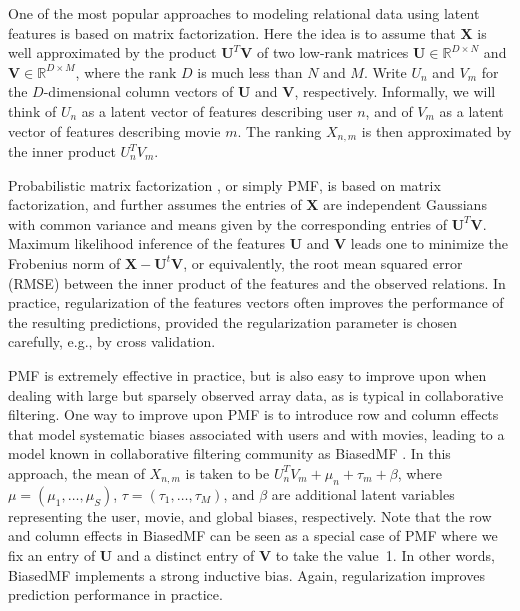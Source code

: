 \documentclass{article} \usepackage{iclr2016_conference,times}
\newcommand{\Reals}{\mathbb{R}}
\begin{document}
One of the most popular approaches to modeling relational data using latent features is based on matrix factorization. Here the idea is 
to assume that $\bm X$ is well approximated by the product $\bm U^T \bm V$ of two low-rank matrices $\bm U \in \Reals^{D \times N}$ and $\bm V \in \Reals^{D \times M}$, where the rank $D$ is much less than $N$ and $M$.
Write $U_n$ and $V_m$ for the $D$-dimensional column vectors of $\bm U$ and $\bm V$, respectively.
Informally, we will think of $U_n$ as a latent vector of features describing user $n$, and of $V_m$ as a latent vector of features describing movie $m$.  The ranking $X_{n,m}$ is then approximated by the inner product $U_n ^T V_m$.
 
Probabilistic matrix factorization \citep{RussPMF}, or simply PMF, is based on matrix factorization, and further assumes the entries of $\bm X$ are independent Gaussians with common variance and means given by the corresponding entries of $\bm U^T \bm V$.  Maximum likelihood inference of the features $\bm U$ and $\bm V$ leads one to minimize the Frobenius norm of $\bm X - \bm U^t \bm V$, or equivalently, the root mean squared error (RMSE) between the inner product of the features and the observed relations.  In practice, regularization of the features vectors often improves the performance of the resulting predictions, provided the regularization parameter is chosen carefully, e.g., by cross validation.
 
 PMF is extremely effective in practice, but is also easy to improve upon when dealing with large but sparsely observed array data, as is typical in collaborative filtering. 
 One way to improve upon PMF is to introduce row and column effects that model systematic biases associated with users and with movies, leading to a model known in collaborative filtering community as BiasedMF \citep{BiasedMF}.  In this approach, the mean of $X_{n,m}$ is taken to be $U_n^T V_m + \mu_n + \tau_m + \beta$, where $\mu = (\mu_1,\dotsc,\mu_S)$, $\tau=(\tau_1,\dotsc,\tau_M)$, and $\beta$ are additional latent variables representing the user, movie, and global biases, respectively.   Note that the row and column effects in BiasedMF can be seen as a special case of PMF where we fix an entry of $\bm U$ and a  distinct entry of $\bm V$ to take the value~1.  In other words, BiasedMF implements a strong inductive bias.
Again, regularization improves prediction performance in practice. 
\end{document}
